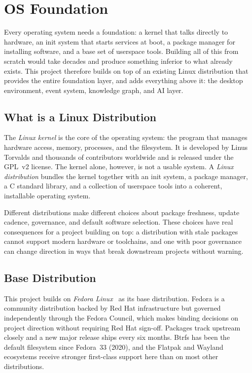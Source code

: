 \section{OS Foundation}
\label{sec:foundation}

Every operating system needs a foundation: a kernel that talks directly to
hardware, an init system that starts services at boot, a package manager for
installing software, and a base set of userspace tools. Building all of this
from scratch would take decades and produce something inferior to what already
exists. This project therefore builds on top of an existing Linux distribution
that provides the entire foundation layer, and adds everything above it: the
desktop environment, event system, knowledge graph, and AI layer.

\subsection{What is a Linux Distribution}
\label{sec:what-is-distro}

The \emph{Linux kernel} is the core of the operating system: the program that
manages hardware access, memory, processes, and the filesystem. It is developed
by Linus Torvalds and thousands of contributors worldwide and is released under
the GPL~v2 license. The kernel alone, however, is not a usable system. A
\emph{Linux distribution} bundles the kernel together with an init system, a
package manager, a C standard library, and a collection of userspace tools into
a coherent, installable operating system.

Different distributions make different choices about package freshness, update
cadence, governance, and default software selection. These choices have real
consequences for a project building on top: a distribution with stale packages
cannot support modern hardware or toolchains, and one with poor governance can
change direction in ways that break downstream projects without warning.

\subsection{Base Distribution}
\label{sec:base-distro}

This project builds on \emph{Fedora Linux}~\cite{fedora} as its base
distribution. Fedora is a community distribution backed by Red Hat
infrastructure but governed independently through the Fedora Council, which
makes binding decisions on project direction without requiring Red Hat
sign-off. Packages track upstream closely and a new major release ships every
six months. Btrfs has been the default filesystem since Fedora~33 (2020), and
the Flatpak and Wayland ecosystems receive stronger first-class support here
than on most other distributions.

